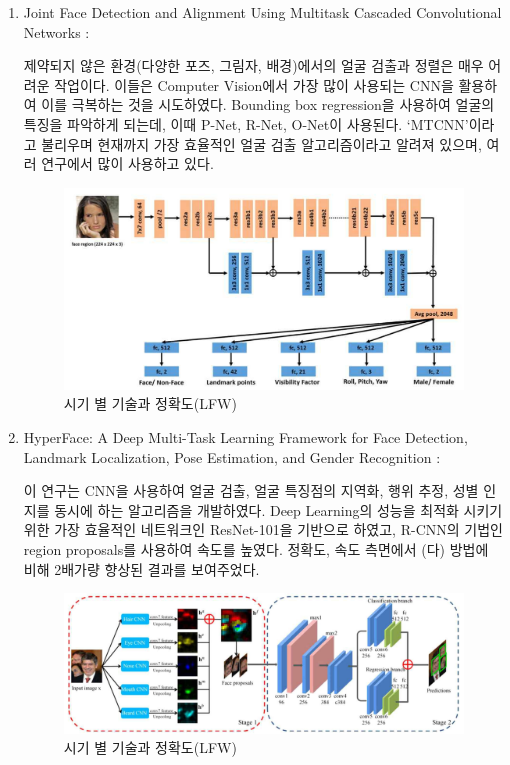 \documentclass{oblivoir}
\begin{document}
\begin{enumerate}
    \item Joint Face Detection and Alignment Using Multitask Cascaded Convolutional Networks : 

    제약되지 않은 환경(다양한 포즈, 그림자, 배경)에서의 얼굴 검출과 정렬은 매우 어려운 작업이다. 
    이들은 Computer Vision에서 가장 많이 사용되는 CNN을 활용하여 이를 극복하는 것을 시도하였다.
    Bounding box regression을 사용하여 얼굴의 특징을 파악하게 되는데, 이때 P-Net, R-Net, O-Net이 사용된다.
    ‘MTCNN’이라고 불리우며 현재까지 가장 효율적인 얼굴 검출 알고리즘이라고 알려져 있으며, 여러 연구에서 많이 사용하고 있다. 

    \begin{figure}[h!]
        \centering
        \includegraphics{pic/chp1/img530}
        \caption{ 시기 별 기술과 정확도(LFW)\cite{reference6}}
    \end{figure}

    \item HyperFace: A Deep Multi-Task Learning Framework for Face Detection, Landmark Localization, Pose Estimation, and Gender Recognition : 

    이 연구는 CNN을 사용하여 얼굴 검출, 얼굴 특징점의 지역화, 행위 추정, 성별 인지를 동시에 하는 알고리즘을 개발하였다. 
    Deep Learning의 성능을 최적화 시키기 위한 가장 효율적인 네트워크인 ResNet-101을 기반으로 하였고, R-CNN의 기법인 region proposals를 사용하여 속도를 높였다. 
    정확도, 속도 측면에서 (다) 방법에 비해 2배가량 향상된 결과를 보여주었다. 

    \begin{figure}[h!]
        \centering
        \includegraphics{pic/chp1/img552}
        \caption{시기 별 기술과 정확도(LFW)\cite{reference6}}
    \end{figure}


\end{enumerate}
\end{document}
